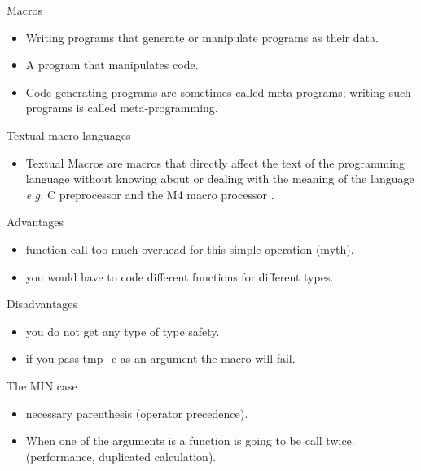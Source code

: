 \begin{frame}{Macros}
\begin{itemize}
\item Writing programs that generate or manipulate programs as their data.
\item A program that manipulates code.
\item Code-generating programs are sometimes called meta-programs; writing such programs
    is called meta-programming.
\end{itemize}
\end{frame}

\begin{frame}{Textual macro languages}
\begin{itemize}
\item Textual Macros are macros that directly affect the text of the programming 
    language without knowing about or dealing with the meaning of the language \emph{e.g.} C 
    preprocessor and the M4 macro processor \cite{macrosibm}. 
\end{itemize}
\end{frame}


\begin{frame}{Advantages}
\begin{itemize}
\item function call too much overhead for this simple operation (myth).
\item you would have to code different functions for different types.
\end{itemize}
\end{frame}

\begin{frame}{Disadvantages}
\begin{itemize}
\item you do not get any type of type safety.
\item if you pass tmp\_c as an argument the macro will fail.
\end{itemize}
\end{frame}


\begin{frame}{The MIN case}
\begin{itemize}
\item necessary parenthesis (operator precedence).
\item When one of the arguments is a function is going to be call twice. (performance, duplicated calculation).
\end{itemize}
\end{frame}





